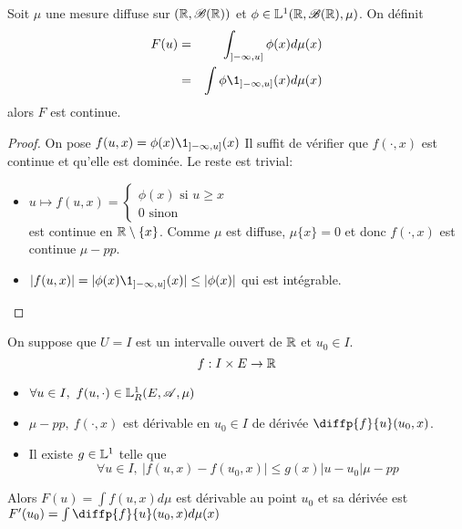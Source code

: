 \begin{example}
	Soit $\mu$ une mesure diffuse sur $(\mathbb{R}, \mathscr{B}(\mathbb{R}))$ et $\phi \in \mathbb{L}^1(\mathbb{R}, \mathscr{B}(\mathbb{R}), \mu)$.
	On définit \begin{eqnarray*}
		F(u) &=&  \int_{]-\infty, u]} \phi(x)d\mu(x)\\
		& = & \int \phi \1_{]-\infty, u]}(x)d\mu(x)
	\end{eqnarray*}
	alors $F$ est continue.

	\begin{proof}
		On pose $f(u,x) = \phi(x)\1_{]-\infty, u]}(x)$
		Il suffit de vérifier que $f(\cdot, x)$ est continue et qu'elle est dominée. Le reste est trivial: \\
		\begin{itemize}
			\item $u \mapsto f(u,x) = \left\{
				      \begin{array}{l}
					      \phi(x) \text{ si } u \geq x \\
					      0 \text{ sinon}
				      \end{array}
				      \right.$ \\
			      est continue en $\mathbb{R}\setminus\{x\}$. Comme $\mu$ est diffuse, $\mu \{x\} = 0$ et donc $f(\cdot, x)$ est continue $\mu-pp$.
			\item $|f(u,x)| = |\phi(x)\1_{]-\infty, u]}(x)| \leq |\phi(x)|$ qui est intégrable.
		\end{itemize}
	\end{proof}
\end{example}


\begin{theorem}
	On suppose que $U = I$ est un intervalle ouvert de $\mathbb{R}$ et $u_0 \in I$.\\
	$$ f: I\times E \to \mathbb{R}$$
	\begin{itemize}
		\item $\forall u \in I, \ f(u, \cdot) \in \mathbb{L}^1_R(E,\mathscr{A}, \mu)$
		\item $\mu-pp,\  f(\cdot, x)$ est dérivable en $u_0 \in I$ de dérivée $\diffp{f}{u} (u_0, x)$.
		\item Il existe $g\in \mathbb{L}^1$ telle que
		      $$ \forall u\in I,\ |f(u,x) - f(u_0,x)| \leq g(x)|u-u_0| \mu-pp$$
	\end{itemize}

	Alors $F(u) = \int f(u,x)d\mu$ est dérivable au point $u_0$ et sa dérivée est $F'(u_0) = \int \diffp{f}{u}(u_0,x)d\mu(x)$
\end{theorem}

